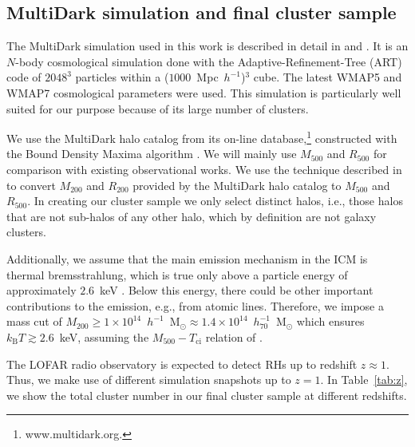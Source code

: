 \documentclass[traditabstract]{aa}
\newcommand{\rmn}{\mathrm}
\begin{document}
\subsection{MultiDark simulation and final cluster sample}
\label{sec:2.1}
The MultiDark simulation used in this work is
described in detail in \cite{2011arXiv1104.5130P} and
\cite{2011arXiv1109.0003R}.  It is an $N$-body cosmological simulation done with
the Adaptive-Refinement-Tree (ART) code \citep{1997ApJS..111...73K} of
$2048^3$ particles within a ($1000$~Mpc~$h^{-1}$)$^3$ cube. The latest WMAP5 and
WMAP7 cosmological parameters were used. This simulation is particularly well
suited for our purpose because of its large number of clusters.
 
We use the MultiDark halo catalog from its on-line database,\footnote{www.multidark.org.} 
constructed with the Bound Density Maxima algorithm \citep{1997astro.ph.12217K}.  
We will mainly use $M_{500}$ and $R_{500}$ for comparison with existing observational works.  
We use the technique described in \cite{2003ApJ...584..702H} to convert $M_{200}$ and
$R_{200}$ provided by the MultiDark halo catalog to $M_{500}$ and $R_{500}$.  In
creating our cluster sample we only select distinct halos, i.e., those halos that
are not sub-halos of any other halo, which by definition are not galaxy clusters.

Additionally, we assume that the main emission mechanism in the ICM is thermal
bremsstrahlung, which is true only above a particle energy of approximately
$2.6$~keV \citep{1988xrec.book.....S}. Below this
energy, there could be other important contributions to the emission,
e.g., from atomic lines. Therefore, we impose a mass cut of
$M_{200}\geq1\times10^{14}$~$h^{-1}$~M$_{\odot}\approx1.4\times10^{14}$~$h_{70}^{-1}$~M$_{\odot}$
which ensures $k_{\rmn{B}}T \gtrsim 2.6$~keV, assuming the $M_{500} - T_{\rmn{ci}}$ relation
of \cite{2010MNRAS.406.1773M}.

The LOFAR radio observatory is expected to detect RHs up to redshift $z \approx
1$. Thus, we make use of different simulation snapshots up to $z=1$. In
Table~\ref{tab:z}, we show the total cluster number in our final cluster sample
at different redshifts.
\end{document}
